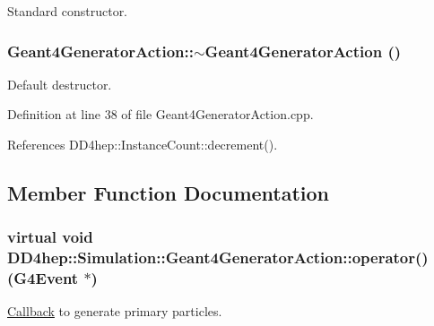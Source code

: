 Standard constructor. \hypertarget{class_d_d4hep_1_1_simulation_1_1_geant4_generator_action_a4b70fe9a48775ddf6853ff699606430d}{
\subsubsection[{$\sim$Geant4GeneratorAction}]{\setlength{\rightskip}{0pt plus 5cm}Geant4GeneratorAction::$\sim$Geant4GeneratorAction ()}}
\label{class_d_d4hep_1_1_simulation_1_1_geant4_generator_action_a4b70fe9a48775ddf6853ff699606430d}


Default destructor. 

Definition at line 38 of file Geant4GeneratorAction.cpp.

References DD4hep::InstanceCount::decrement().

\subsection{Member Function Documentation}
\hypertarget{class_d_d4hep_1_1_simulation_1_1_geant4_generator_action_ac5a1d2335a19e3f9d555081199e01801}{
\subsubsection[{operator()}]{\setlength{\rightskip}{0pt plus 5cm}virtual void DD4hep::Simulation::Geant4GeneratorAction::operator() (G4Event $\ast$)}}
\label{class_d_d4hep_1_1_simulation_1_1_geant4_generator_action_ac5a1d2335a19e3f9d555081199e01801}


\hyperlink{class_d_d4hep_1_1_callback}{Callback} to generate primary particles. 

